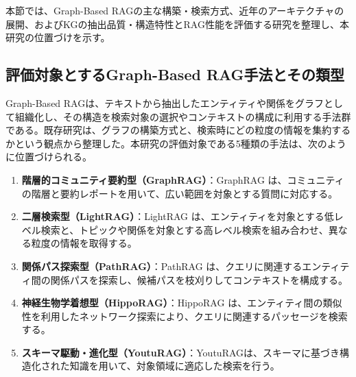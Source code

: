 \documentclass[a4j,dvipdfmx]{jsarticle}
\begin{document}
本節では、Graph-Based RAGの主な構築・検索方式、近年のアーキテクチャの展開、およびKGの抽出品質・構造特性とRAG性能を評価する研究を整理し、本研究の位置づけを示す。

\subsection{評価対象とするGraph-Based RAG手法とその類型}
Graph-Based RAGは、テキストから抽出したエンティティや関係をグラフとして組織化し、その構造を検索対象の選択やコンテキストの構成に利用する手法群である。既存研究は、グラフの構築方式と、検索時にどの粒度の情報を集約するかという観点から整理した\cite{pan2024unifying}。本研究の評価対象である5種類の手法は、次のように位置づけられる。
\begin{enumerate}
    \item \textbf{階層的コミュニティ要約型（GraphRAG）}：GraphRAG \cite{edge2024graphrag} は、コミュニティの階層と要約レポートを用いて、広い範囲を対象とする質問に対応する。
    \item \textbf{二層検索型（LightRAG）}：LightRAG \cite{guo2024lightrag} は、エンティティを対象とする低レベル検索と、トピックや関係を対象とする高レベル検索を組み合わせ、異なる粒度の情報を取得する。
    \item \textbf{関係パス探索型（PathRAG）}：PathRAG \cite{chen2024pathrag} は、クエリに関連するエンティティ間の関係パスを探索し、候補パスを枝刈りしてコンテキストを構成する。
    \item \textbf{神経生物学着想型（HippoRAG）}：HippoRAG \cite{gutierrez2024hipporag} は、エンティティ間の類似性を利用したネットワーク探索により、クエリに関連するパッセージを検索する。
    \item \textbf{スキーマ駆動・進化型（YoutuRAG）}：YoutuRAGは、スキーマに基づき構造化された知識を用いて、対象領域に適応した検索を行う\cite{dong2025youtu}。
\end{enumerate}
\end{document}
